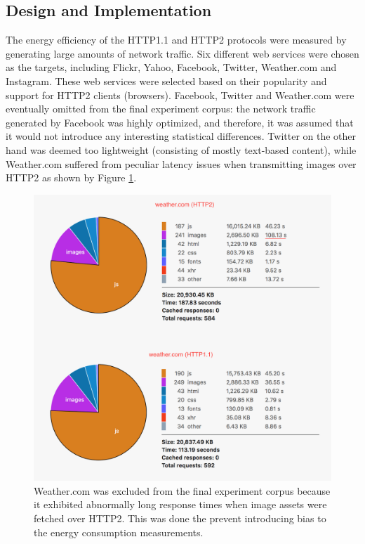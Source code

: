 \documentclass{article}
\begin{document}
\subsection{Design and Implementation}
\label{chapter:design-implementation}

The energy efficiency of the HTTP1.1 and HTTP2 protocols were measured by generating large amounts of network traffic. Six different web services were chosen as the targets, including Flickr, Yahoo, Facebook, Twitter, Weather.com and Instagram. These web services were selected based on their popularity and support for HTTP2 clients (browsers). Facebook, Twitter and Weather.com were eventually omitted from the final experiment corpus: the network traffic generated by Facebook was highly optimized, and therefore, it was assumed that it would not introduce any interesting statistical differences. Twitter on the other hand was deemed too lightweight (consisting of mostly text-based content), while Weather.com suffered from peculiar latency issues when transmitting images over HTTP2 as shown by Figure \ref{fig:weather.com}.

\begin{figure}[h!]
\centering
\includegraphics[scale=0.6]{images/weathercom.png}
\caption{Weather.com was excluded from the final experiment corpus because it exhibited abnormally long response times when image assets were fetched over HTTP2. This was done the prevent introducing bias to the energy consumption measurements.}
\label{fig:weather.com}
\end{figure}
\end{document}
